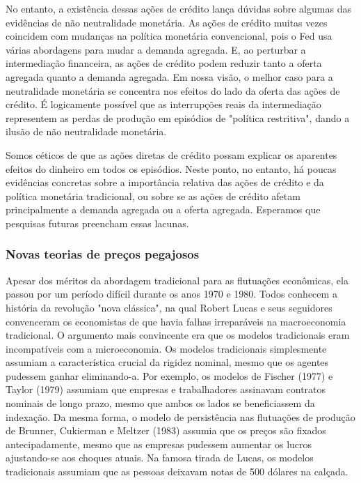 \documentclass[12pt]{article}
\begin{document}
No entanto, a existência dessas ações de crédito lança dúvidas sobre algumas das evidências de não neutralidade monetária. As ações de crédito muitas vezes coincidem com mudanças na política monetária convencional, pois o Fed usa várias abordagens para mudar a demanda agregada. E, ao perturbar a intermediação financeira, as ações de crédito podem reduzir tanto a oferta agregada quanto a demanda agregada. Em nossa visão, o melhor caso para a neutralidade monetária se concentra nos efeitos do lado da oferta das ações de crédito. É logicamente possível que as interrupções reais da intermediação representem as perdas de produção em episódios de "política restritiva", dando a ilusão de não neutralidade monetária.

Somos céticos de que as ações diretas de crédito possam explicar os aparentes efeitos do dinheiro em todos os episódios. Neste ponto, no entanto, há poucas evidências concretas sobre a importância relativa das ações de crédito e da política monetária tradicional, ou sobre se as ações de crédito afetam principalmente a demanda agregada ou a oferta agregada. Esperamos que pesquisas futuras preencham essas lacunas.

\subsubsection{\textbf{Novas teorias de preços pegajosos}}

Apesar dos méritos da abordagem tradicional para as flutuações econômicas, ela passou por um período difícil durante os anos 1970 e 1980. Todos conhecem a história da revolução "nova clássica", na qual Robert Lucas e seus seguidores convenceram os economistas de que havia falhas irreparáveis na macroeconomia tradicional. O argumento mais convincente era que os modelos tradicionais eram incompatíveis com a microeconomia. Os modelos tradicionais simplesmente assumiam a característica crucial da rigidez nominal, mesmo que os agentes pudessem ganhar eliminando-a. Por exemplo, os modelos de Fischer (1977) e Taylor (1979) assumiam que empresas e trabalhadores assinavam contratos nominais de longo prazo, mesmo que ambos os lados se beneficiassem da indexação. Da mesma forma, o modelo de persistência nas flutuações de produção de Brunner, Cukierman e Meltzer (1983) assumia que os preços são fixados antecipadamente, mesmo que as empresas pudessem aumentar os lucros ajustando-se aos choques atuais. Na famosa tirada de Lucas, os modelos tradicionais assumiam que as pessoas deixavam notas de 500 dólares na calçada.
\end{document}

